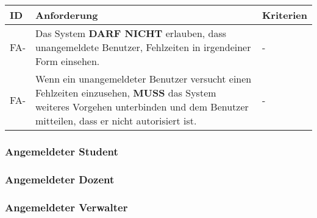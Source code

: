 \vspace{12pt}

\begin{tabular} {|p{}|p{11cm}|p{}|}
	\hline
	ID & Anforderung & Kriterien \\
	\hline
	FA-
	& Das System \textbf{DARF NICHT} erlauben, dass unangemeldete Benutzer, Fehlzeiten in irgendeiner Form einsehen. 
	& - \\
	\hline
	FA-
	& Wenn ein unangemeldeter Benutzer versucht einen Fehlzeiten einzusehen, \textbf{MUSS} das System weiteres Vorgehen unterbinden und dem Benutzer mitteilen, dass er nicht autorisiert ist.
	& - \\ 
	\hline
\end{tabular}

\subsubsection{Angemeldeter Student}

\subsubsection{Angemeldeter Dozent}

\subsubsection{Angemeldeter Verwalter}
